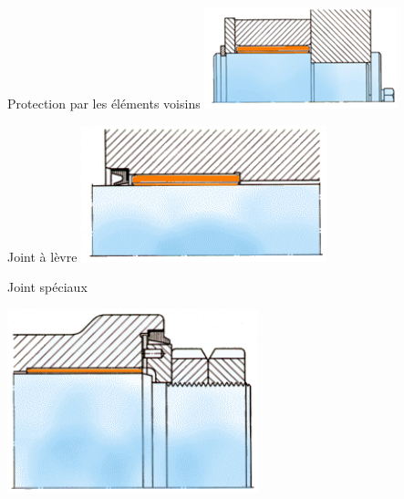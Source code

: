 \documentclass[11pt,oneside]{article}
\begin{document}
\noindent\begin{minipage}[c]{.3\linewidth}
\begin{center}
Protection par les éléments voisins
\includegraphics[width=.85\textwidth]{png/fig25}
\end{center}
\end{minipage}\hfill
\begin{minipage}[c]{.3\linewidth}
\begin{center}
Joint à lèvre
\includegraphics[width=.85\textwidth]{png/fig26}
\end{center}
\end{minipage}\hfill
\begin{minipage}[c]{.3\linewidth}
Joint spéciaux
\begin{center}
\includegraphics[width=.9\textwidth]{png/fig27}
\end{center}
\end{minipage}
 
\end{document}
